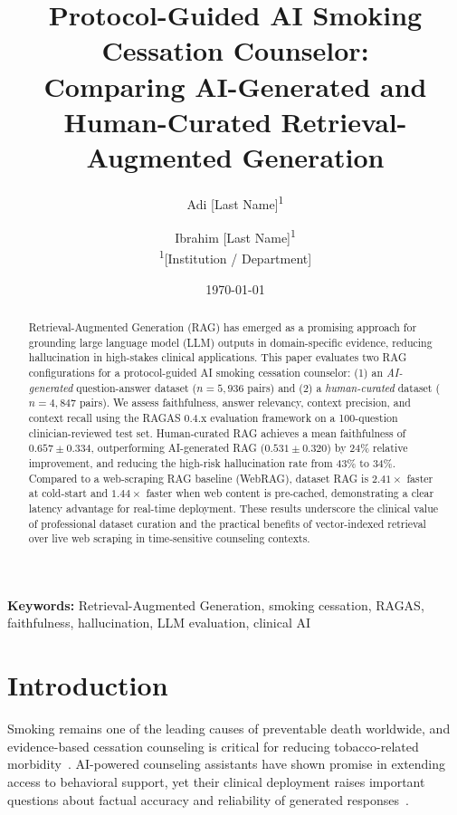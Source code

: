 \documentclass[11pt,a4paper]{article}
\title{\textbf{Protocol-Guided AI Smoking Cessation Counselor:\\
Comparing AI-Generated and Human-Curated Retrieval-Augmented Generation}}
\author{
  Adi [Last Name]\textsuperscript{1} \and
  Ibrahim [Last Name]\textsuperscript{1} \\[0.5em]
  \textsuperscript{1}[Institution / Department]
}
\date{\today}
\begin{document}
\maketitle

\begin{abstract}
Retrieval-Augmented Generation (RAG) has emerged as a promising approach
for grounding large language model (LLM) outputs in domain-specific evidence,
reducing hallucination in high-stakes clinical applications.
This paper evaluates two RAG configurations for a protocol-guided AI smoking
cessation counselor: (1) an \emph{AI-generated} question-answer dataset
($n=5{,}936$ pairs) and (2) a \emph{human-curated} dataset ($n=4{,}847$ pairs).
We assess faithfulness, answer relevancy, context precision, and context recall
using the RAGAS 0.4.x evaluation framework on a 100-question clinician-reviewed
test set.
Human-curated RAG achieves a mean faithfulness of $0.657 \pm 0.334$,
outperforming AI-generated RAG ($0.531 \pm 0.320$) by 24\% relative improvement,
and reducing the high-risk hallucination rate from 43\% to 34\%.
Compared to a web-scraping RAG baseline (WebRAG), dataset RAG is
$2.41\times$ faster at cold-start and $1.44\times$ faster when web content is
pre-cached, demonstrating a clear latency advantage for real-time deployment.
These results underscore the clinical value of professional dataset curation
and the practical benefits of vector-indexed retrieval over live web scraping
in time-sensitive counseling contexts.
\end{abstract}

\textbf{Keywords:} Retrieval-Augmented Generation, smoking cessation,
RAGAS, faithfulness, hallucination, LLM evaluation, clinical AI

\section{Introduction}

Smoking remains one of the leading causes of preventable death worldwide,
and evidence-based cessation counseling is critical for reducing tobacco-related
morbidity~\citep{who2023tobacco}.
AI-powered counseling assistants have shown promise in extending access to
behavioral support, yet their clinical deployment raises important questions
about factual accuracy and reliability of generated responses~\citep{thirunavukarasu2023}.
\end{document}
